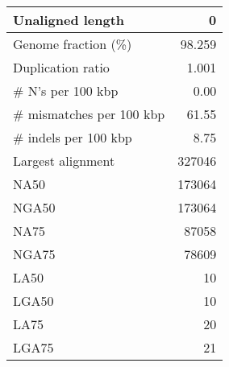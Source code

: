 \documentclass[12pt,a4paper]{article}
\begin{document}
\begin{table}[ht]
\begin{center}
\begin{tabular}{|l*{1}{|r}|}
Unaligned length & 0 \\ \hline
Genome fraction (\%) & 98.259 \\ \hline
Duplication ratio & 1.001 \\ \hline
\# N's per 100 kbp & 0.00 \\ \hline
\# mismatches per 100 kbp & 61.55 \\ \hline
\# indels per 100 kbp & 8.75 \\ \hline
Largest alignment & 327046 \\ \hline
NA50 & 173064 \\ \hline
NGA50 & 173064 \\ \hline
NA75 & 87058 \\ \hline
NGA75 & 78609 \\ \hline
LA50 & 10 \\ \hline
LGA50 & 10 \\ \hline
LA75 & 20 \\ \hline
LGA75 & 21 \\ \hline
\end{tabular}
\end{center}
\end{table}
\end{document}
